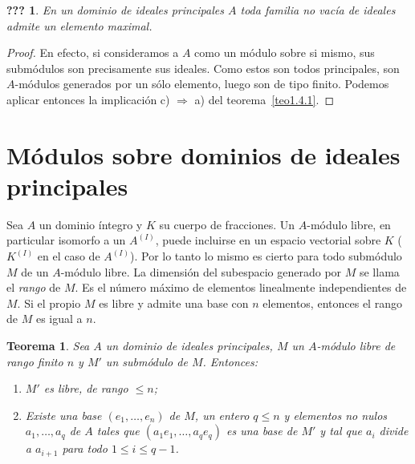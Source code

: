 \documentclass[oneside,bibtotoc,leqno,spanish]{amsbook}
\newcommand{\then}{\ensuremath{\Rightarrow}\xspace}
\numberwithin{equation}{section}
\theoremstyle{defi}
\theoremstyle{note}
\newtheorem{theorem}{Teorema}
\newcommand{\namedname}{???}
\newtheorem*{namedthm}{\namedname}
\newenvironment{named}[1]%
	{\renewcommand{\namedname}{#1}%
	\begin{namedthm}}%
	{\end{namedthm}}
\theoremstyle{rem}
\numberwithin{theorem}{section}
\numberwithin{proposition}{section}
\numberwithin{definition}{section}
\numberwithin{lemma}{section}
\numberwithin{corollary}{section}
\numberwithin{example}{section}
\numberwithin{footnote}{section}%
\begin{document}
\begin{named}{Corolario del teorema 1}
En un dominio de ideales principales $A$ toda familia no vac\'ia
de ideales admite un elemento maximal.
\end{named}

\begin{proof}
En efecto, si consideramos a $A$ como un m\'odulo sobre si
mismo, sus subm\'odulos son precisamente sus ideales. Como estos
son todos principales, son $A$-m\'odulos generados por un
s\'olo elemento, luego son de tipo finito. Podemos aplicar
entonces la implicaci\'on c) \then a) del teorema~\ref{teo1.4.1}.
\end{proof}

\section{M\'odulos sobre dominios de ideales principales}\label{sec1.5}

Sea $A$ un dominio \'integro y $K$ su cuerpo de fracciones. Un $A$-m\'odulo
libre, en particular isomorfo a un $A^{(I)}$, puede incluirse en
un espacio vectorial sobre $K$ ($K^{(I)}$ en el caso de $A^{(I)}$).
Por lo tanto lo mismo es cierto para todo subm\'odulo $M$ de un
$A$-m\'odulo libre. La dimensi\'on del subespacio generado por
$M$ se llama el {\em rango} de $M$. Es el n\'umero m\'aximo de
elementos linealmente independientes de $M$. Si el propio $M$ es libre
y admite una base con $n$ elementos, entonces el rango de $M$ es
igual a $n$.

\begin{theorem}\label{teo1.5.1}
Sea $A$ un dominio de ideales principales, $M$ un $A$-m\'odulo
libre de rango finito $n$ y $M'$ un subm\'odulo de $M$. Entonces:
\begin{enumerate}
\item $M'$ es libre, de rango $\leq n$;
\item Existe una base $(e_{1},\dots,e_{n})$ de $M$, un entero
$q\leq n$ y elementos no nulos $a_{1},\dots,a_{q}$ de $A$ tales que
$(a_{1}e_{1},\dots, a_{q}e_{q})$ es una base de $M'$ y tal que
$a_{i}$ divide a $a_{i+1}$ para todo $1\leq i\leq q-1$.
\end{enumerate}
\end{theorem}
\end{document}
